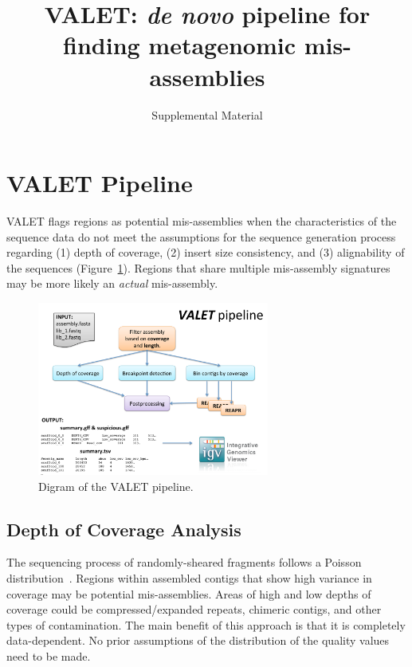 \documentclass{article}
\begin{document}
\title{VALET: \emph{de novo} pipeline for finding metagenomic mis-assemblies}
\author{Supplemental Material}
\date{}
\maketitle
\section{VALET Pipeline}
VALET flags regions as potential mis-assemblies when the characteristics of the sequence data do not meet the assumptions for the sequence generation process regarding (1) depth of coverage, (2) insert size consistency, and (3) alignability of the sequences (Figure~\ref{fig:valet_pipeline}). 
Regions that share multiple mis-assembly signatures may be more likely an \textit{actual} mis-assembly.

\begin{figure}[tb!]
\begin{center}
\includegraphics[width=3in]{figures/valet_pipeline}
\end{center}
\caption[valet_pipeline]{Digram of the VALET pipeline.}
\label{fig:valet_pipeline}
\end{figure}

\subsection{Depth of Coverage Analysis}
The sequencing process of randomly-sheared fragments follows a Poisson distribution~\citep{lander1988genomic}.  Regions within assembled contigs that show high variance in coverage may be potential mis-assemblies. 
Areas of high and low depths of coverage could be compressed/expanded repeats, chimeric contigs, and other types of contamination. 
The main benefit of this approach is that it is completely data-dependent. No prior assumptions of the distribution of the quality values need to be made.
\end{document}
